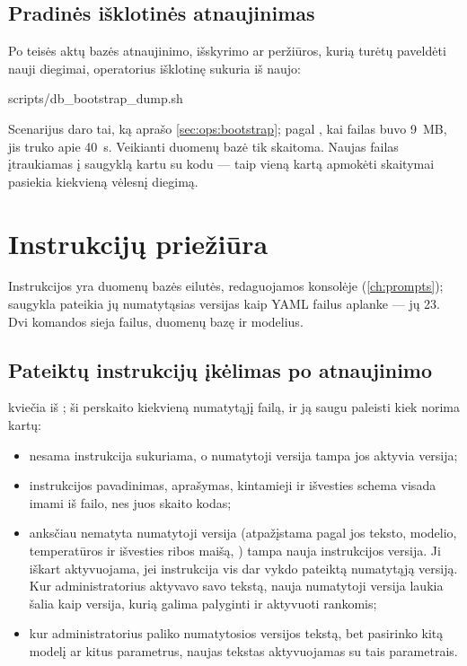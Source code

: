 \subsection{Pradinės išklotinės atnaujinimas}

Po teisės aktų bazės atnaujinimo, išskyrimo ar peržiūros, kurią turėtų paveldėti nauji diegimai,
operatorius išklotinę sukuria iš naujo:

\begin{codeblock}
scripts/db_bootstrap_dump.sh
\end{codeblock}

Scenarijus daro tai, ką aprašo \cref{sec:ops:bootstrap}; pagal , kai
failas buvo 9~MB, jis truko apie
40~s. Veikianti duomenų bazė tik skaitoma. Naujas failas įtraukiamas į saugyklą kartu su kodu ---
taip vieną kartą apmokėti skaitymai pasiekia kiekvieną vėlesnį diegimą.


\section{Instrukcijų priežiūra}\label{sec:ops:prompts}

Instrukcijos yra duomenų bazės eilutės, redaguojamos konsolėje (\cref{ch:prompts}); saugykla
pateikia jų numatytąsias versijas kaip YAML failus aplanke  --- jų 23. Dvi
komandos sieja failus, duomenų bazę ir modelius.

\subsection{Pateiktų instrukcijų įkėlimas po atnaujinimo}

 kviečia  iš ; ši perskaito kiekvieną
numatytąjį failą, ir ją saugu paleisti kiek norima kartų:

\begin{itemize}
  \item nesama instrukcija sukuriama, o numatytoji versija tampa jos aktyvia versija;
  \item instrukcijos pavadinimas, aprašymas, kintamieji ir išvesties schema visada imami iš failo, nes
    juos skaito kodas;
  \item anksčiau nematyta numatytoji versija (atpažįstama pagal jos teksto, modelio, temperatūros
    ir išvesties ribos maišą, ) tampa nauja instrukcijos versija. Ji iškart
    aktyvuojama, jei instrukcija vis dar vykdo pateiktą numatytąją versiją. Kur administratorius
    aktyvavo savo tekstą, nauja numatytoji versija laukia šalia kaip versija, kurią galima
    palyginti ir aktyvuoti rankomis;
  \item kur administratorius paliko numatytosios versijos tekstą, bet pasirinko kitą modelį ar
    kitus parametrus, naujas tekstas aktyvuojamas su tais parametrais.
\end{itemize}

